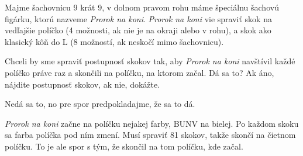
Majme šachovnicu 9 krát 9, v dolnom pravom rohu máme špeciálnu šachovú figárku, 
ktorú nazveme \emph{Prorok na koni}. 
\emph{Prorok na koni}
vie spraviť skok na vedľajšie políčko (4 možnosti, ak nie je na okraji alebo
v rohu), a skok ako klasický kôň do L (8 možností, ak neskočí mimo šachovnicu). 

Chceli by sme spraviť postupnosť skokov tak, aby \emph{Prorok na koni} navštívil
každé políčko práve raz a skončili na políčku, na ktorom začal. 
Dá sa to? Ak áno, nájdite postupnosť skokov, ak nie, dokážte.

Nedá sa to, no pre spor predpokladajme, že sa to dá. 

\emph{Prorok na koni} začne na políčku nejakej farby, BUNV na bielej. Po každom skoku sa farba políčka
pod ním zmení. Musí spraviť 81 skokov, takže skončí na čietnom políčku. To je ale spor s tým, že
skončil na tom políčku, kde začal.



